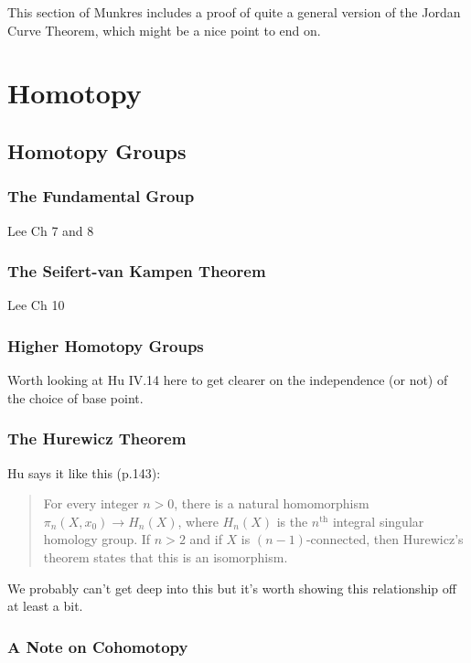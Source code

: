 \documentclass[oneside,english]{amsbook}
\numberwithin{section}{chapter}
\theoremstyle{plain}
\theoremstyle{definition}
\begin{document}
	This section of Munkres includes a proof of quite a general version of the Jordan Curve Theorem, which might be a nice point to end on.
	
	\part{Homotopy}
	
	\chapter{Homotopy Groups}
	
	\section{The Fundamental Group}
	
	Lee Ch 7 and 8
	
	\section{The Seifert-van Kampen Theorem}
	
	Lee Ch 10
	
	\section{Higher Homotopy Groups}
	
	Worth looking at Hu IV.14 here to get clearer on the independence (or not) of the choice of base point.

	\section{The Hurewicz Theorem}
	
	Hu says it like this (p.143):
	\begin{quote}
		For every integer $n > 0$, there is a natural homomorphism $\pi_n(X, x_0)\to H_n(X)$, where $H_n(X)$ is the $n^\text{th}$ integral singular homology group. If $n > 2$ and if $X$ is $(n - 1)$-connected, then Hurewicz's theorem states that this is an isomorphism. 
	\end{quote}
	
	We probably can't get deep into this but it's worth showing this relationship off at least a bit.
	
	\section{A Note on Cohomotopy}
	
\end{document}
